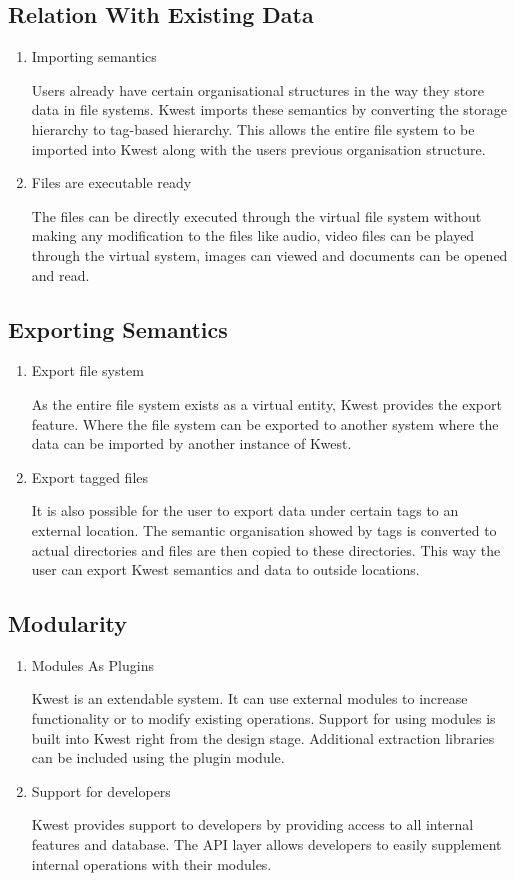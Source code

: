 \subsection{Relation With Existing Data}
\begin{enumerate}
\item Importing semantics 

Users already have certain organisational structures in the way they store data in file systems. Kwest imports these semantics by converting the storage hierarchy to tag-based hierarchy. This allows the entire file system to be imported into Kwest along with the users previous organisation structure. 
\item Files are executable ready 

The files can be directly executed through the virtual file system without making any modification to the files like audio, video files can be played through the virtual system, images can viewed and documents can be opened and read.  
\end{enumerate}

\subsection{Exporting Semantics}
\begin{enumerate}
\item Export file system 

As the entire file system exists as a virtual entity, Kwest provides the export feature. Where the file system can be exported to another system where the data can be imported by another instance of Kwest. 
\item Export tagged files 

It is also possible for the user to export data under certain tags to an external location. The semantic organisation showed by tags is converted to actual directories and files are then copied to these directories. This way the user can export Kwest semantics and data to outside locations.
\end{enumerate}
	
\subsection{Modularity}
\begin{enumerate}
\item Modules As Plugins 

Kwest is an extendable system. It can use external modules to increase functionality or to modify existing operations. Support for using modules is built into Kwest right from the design stage. Additional extraction libraries can be included using the plugin module.
\item Support for developers 

Kwest provides support to developers by providing access to all internal features and database. The API layer allows developers to easily supplement internal operations with their modules.
\end{enumerate}

